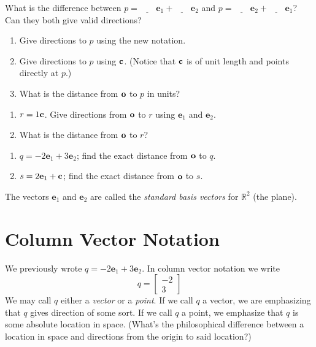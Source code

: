 \documentclass[14pt]{problemset}
\newcommand{\ull}{\underline{\phantom{xxx}}}
\newcommand{\xh}{{{\mathbf e}_1}}
\newcommand{\yh}{{{\mathbf e}_2}}
\newcommand{\R}{\mathbb{R}}
\begin{document}
\begin{minipage}{6.2in}
\begin{minipage}{.65\textwidth}
	\begin{parts}
		\item What is the difference between $p = \ull\, \xh + \ull\, \yh$ and $p = \ull\, \yh + \ull\, \xh$?
		Can they both give valid directions?
		\item
		\begin{enumerate}
			\item Give directions to $p$ using the new notation. 
			\item Give directions to $p$ using $\bf c$.  (Notice that
				$\bf c$ is of unit length and points directly at $p$.)
			\item What is the distance from $\bf o$ to $p$ in units?
		\end{enumerate}
		\item
		\begin{enumerate}
			\item $r=1\bf c$.  Give directions from $\bf o$ to $r$ using $\xh$ and $\yh$.
			\item What is the distance from $\bf o$ to $r$?
		\end{enumerate}
		\item
		\begin{enumerate}
			\item $q=-2\xh+3\yh$; find the exact distance from $\bf o$ to $q$.
			\item $s=2\xh+\bf c$; find the exact distance from $\bf o$ to $s$.
		\end{enumerate}
	\end{parts}
	\end{minipage}


	The vectors $\xh$ and $\yh$ are called the \emph{standard
	basis vectors} for $\R^2$ (the plane).  
\end{minipage}

\section*{Column Vector Notation}
	We previously wrote $q=-2\xh+3\yh$.  In column vector notation we write
	\[
		q=\begin{bmatrix}-2\\3\end{bmatrix}
	\]
	We may call $q$ either a \emph{vector} or a \emph{point}.  If we call $q$ a vector,
	we are emphasizing that $q$ gives direction of some sort.  If we call $q$ a point,
	we emphasize that $q$ is some absolute location in space. (What's the philosophical
	difference between a location in space and directions from the origin to said location?)
\end{document}
